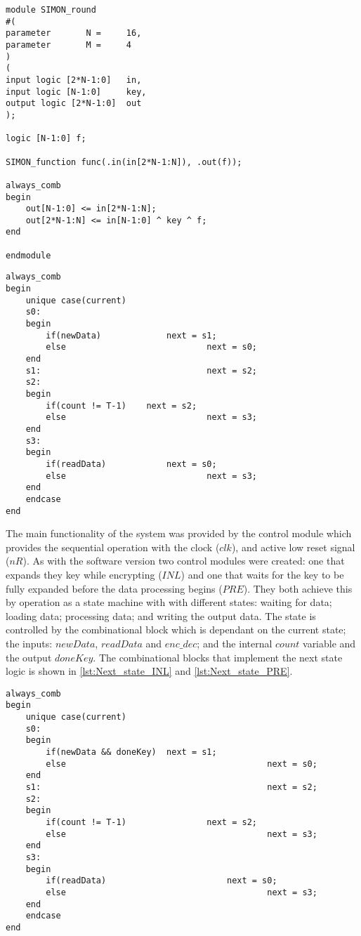\documentclass[12pt,twoside,a4paper]{report}
\begin{document}
	\begin{minipage}{\linewidth}
	\begin{lstlisting}[label={lst:Round_function},caption={The Round function},style=CStyle]	
module SIMON_round
#(
parameter 		N = 	16,
parameter 		M = 	4	
)
(
input logic [2*N-1:0] 	in,
input logic [N-1:0] 	key,	
output logic [2*N-1:0]	out
);

logic [N-1:0] f;

SIMON_function func(.in(in[2*N-1:N]), .out(f));

always_comb
begin
	out[N-1:0] <= in[2*N-1:N];
	out[2*N-1:N] <= in[N-1:0] ^ key ^ f;
end

endmodule
	\end{lstlisting}
	\end{minipage}
	
	\begin{minipage}{\linewidth}
	\begin{lstlisting}[label={lst:Next_state_INL},caption={The next state logic for the ($INL$) control module},style=CStyle]
always_comb
begin
	unique case(current)
	s0:
	begin
		if(newData)				next = s1;
		else							next = s0;
	end
	s1:									next = s2;
	s2:
	begin
		if(count != T-1)	next = s2;
		else							next = s3;
	end
	s3:
	begin
		if(readData)			next = s0;
		else							next = s3;
	end
	endcase
end
	\end{lstlisting}
	\end{minipage}
	
        The main functionality of the system was provided by the control module which provides the sequential operation with the clock ($clk$), and active low reset signal ($nR$). As with the software version two control modules were created: one that expands they key while encrypting ($INL$) and one that waits for the key to be fully expanded before the data processing begins ($PRE$). They both achieve this by operation as a state machine with with different states: waiting for data; loading data; processing data; and writing the output data. The state is controlled by the combinational block which is dependant on the current state; the inputs: $newData$, $readData$ and $enc\_dec$; and the internal $count$ variable and the output $doneKey$. The combinational blocks that implement the next state logic is shown in \autoref{lst:Next_state_INL} and \ref{lst:Next_state_PRE}.

	\begin{minipage}{\linewidth}
	\begin{lstlisting}[label={lst:Next_state_PRE},caption={The next state logic for the ($PRE$) control module},style=CStyle]	
always_comb
begin
	unique case(current)
	s0:
	begin
		if(newData && doneKey)	next = s1;
		else										next = s0;
	end
	s1:												next = s2;
	s2:
	begin
		if(count != T-1)				next = s2;
		else										next = s3;
	end
	s3:
	begin
		if(readData)						next = s0;
		else										next = s3;
	end
	endcase
end
	\end{lstlisting}
	\end{minipage}
	
\end{document}
